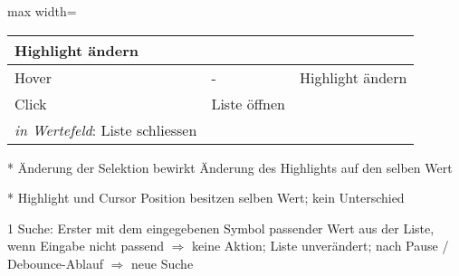 \begin{table}[!htb]
\begin{adjustbox}{max width=\textwidth}
\begin{threeparttable}
\begin{tabular}{ l || l | l }
{                                                                         Highlight ändern}        \\
                \hline
                Hover      & -                     & Highlight ändern                             \\
                \hline
                Click      & Liste öffnen          & \tbbr{\emph{in Liste}: Selektion ändern \\
                                                           \emph{in Wertefeld}: Liste schliessen} \\
                \hline
            \end{tabular}
            \begin{tablenotes}
                \scriptsize
                \item[*] Änderung der Selektion bewirkt Änderung des Highlights auf den selben Wert
                \item[*] Highlight und Cursor Position besitzen selben Wert; kein Unterschied
                \item
                \item[1] Suche: Erster mit dem eingegebenen Symbol passender Wert aus der Liste, wenn Eingabe nicht passend $\Rightarrow$ keine Aktion; 
                                Liste unverändert; nach Pause / Debounce-Ablauf $\Rightarrow$ neue Suche
            \end{tablenotes}
        \end{threeparttable}
    \end{adjustbox}
\end{table}

